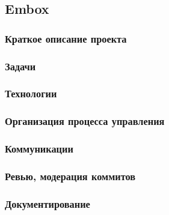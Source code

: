 \documentclass[a5paper]{article}
\begin{document}
\subsection{Embox}

\subsubsection{Краткое описание проекта}

\subsubsection{Задачи}

\subsubsection{Технологии}

\subsubsection{Организация процесса управления}

\subsubsection{Коммуникации}

\subsubsection{Ревью, модерация коммитов}

\subsubsection{Документирование}
\end{document}
